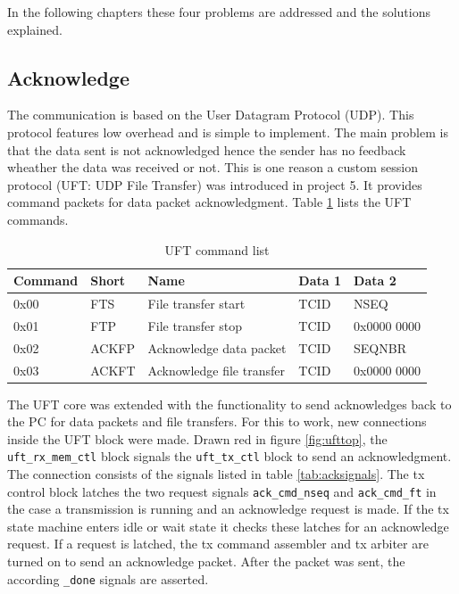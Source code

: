 In the following chapters these four problems are addressed and the solutions
explained.

\subsection{Acknowledge}
The communication is based on the User Datagram Protocol (UDP). This protocol
features low overhead and is simple to implement. The main problem is that the
data sent is not acknowledged hence the sender has no feedback wheather the data
was received or not. This is one reason a custom session protocol (UFT: UDP
File Transfer) was introduced in project 5. It provides command packets for data
packet acknowledgment. Table \ref{tab:uftcommandlist} lists the UFT commands.


\begin{table}[t!]
    \centering
    \begin{tabular}{l l l l l}
        \toprule
        Command & Short & Name & Data 1 & Data 2 \\
        \midrule
        0x00 & FTS & 
        File transfer start & TCID & NSEQ
        \\
        0x01 & FTP &
        File transfer stop & TCID & 0x0000 0000
        \\
        0x02 & ACKFP &
        Acknowledge data packet & TCID & SEQNBR
        \\
        0x03 & ACKFT &
        Acknowledge file transfer & TCID & 0x0000 0000
        \\
        \bottomrule
    \end{tabular}
    \caption{UFT command list}
    \label{tab:uftcommandlist}
\end{table}

The UFT core was extended with the functionality to send acknowledges back to
the PC for data packets and file transfers. For this to work, new connections
inside the UFT block were made. Drawn red in figure \ref{fig:ufttop}, the 
\texttt{uft\_rx\_mem\_ctl} block signals the \texttt{uft\_tx\_ctl} block to send
an acknowledgment. The connection consists of the signals listed in table 
\ref{tab:acksignals}. The tx control block latches the two request signals 
\texttt{ack\_cmd\_nseq} and \texttt{ack\_cmd\_ft} in the case a transmission is
running and an acknowledge request is made. If the tx state machine enters idle
or wait state it checks these latches for an acknowledge request. If a request
is latched, the tx command assembler and tx arbiter are turned on to send an
acknowledge packet. After the packet was sent, the according \texttt{\_done}
signals are asserted.


